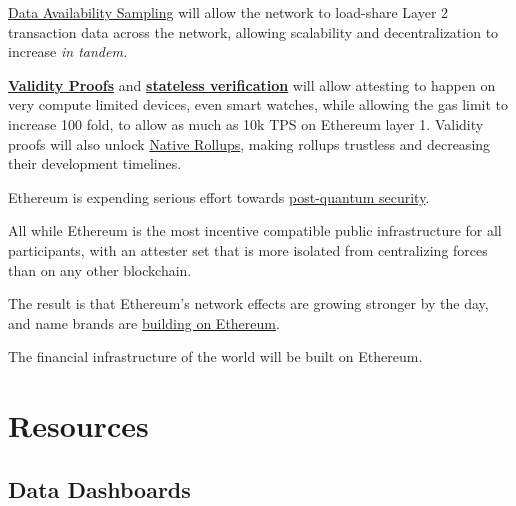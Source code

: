 \documentclass[12pt]{article}
\begin{document}
\hyperref[PeerDAS]{Data Availability Sampling} will allow the network to load-share Layer 2 transaction data across the network, allowing scalability and decentralization to increase \textit{in tandem.}

\hyperref[Validity Proofs]{\textbf{Validity Proofs}} and \hyperref[Stateless Verification]{\textbf{stateless verification}} will allow attesting to happen on very compute limited devices, even smart watches, while allowing the gas limit to increase 100 fold, to allow as much as 10k TPS on Ethereum layer 1. Validity proofs will also unlock \hyperref[Native Rollups]{Native Rollups}, making rollups trustless and decreasing their development timelines.

Ethereum is expending serious effort towards \hyperref[Making Ethereum Quantum Resistant]{post-quantum security}. 

All while Ethereum is the most incentive compatible public infrastructure for all participants, with an attester set that is more isolated from centralizing forces than on any other blockchain. 

The result is that Ethereum's network effects are growing stronger by the day, and name brands are \href{https://ethereumadoption.com/built-on-ethereum?view=byDate}{building on Ethereum}. 

The financial infrastructure of the world will be built on Ethereum. 

\section{Resources}

\subsection{Data Dashboards}
\end{document}

